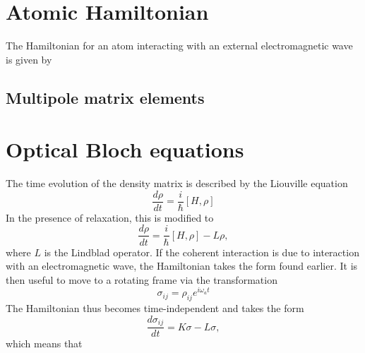 \documentclass{article}
\begin{document}
\section{Atomic Hamiltonian}
The Hamiltonian for an atom interacting with an external electromagnetic wave is given by

\subsection{Multipole matrix elements}

\section{Optical Bloch equations}
The time evolution of the density matrix is described by the Liouville equation
\begin{equation}
    \frac{d \rho}{dt} = \frac{i}{\hbar} [H, \rho]
\end{equation}
In the presence of relaxation, this is modified to
\begin{equation}
    \frac{d \rho}{dt} = \frac{i}{\hbar} [H, \rho] - L \rho,
\end{equation}
where $L$ is the Lindblad operator. If the coherent interaction is due to interaction with an electromagnetic wave,
the Hamiltonian takes the form found earlier.
It is then useful to move to a rotating frame via the transformation
\begin{equation}
    \sigma_{ij} = \rho_{ij} e^{i \omega_a t}
\end{equation}
The Hamiltonian thus becomes time-independent and takes the form
\begin{equation}
    \frac{d \sigma_{ij}}{dt} = K \sigma - L \sigma,
\end{equation}
which means that
\end{document}
